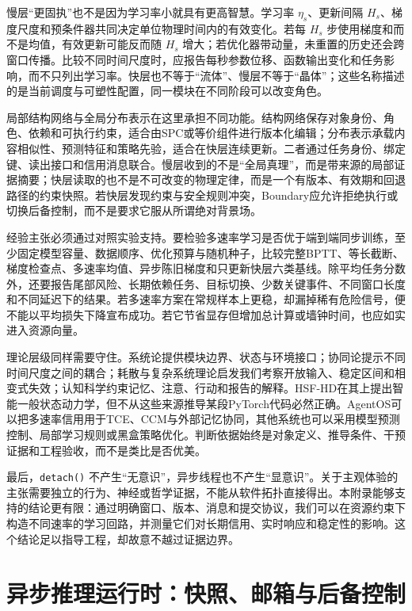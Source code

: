 慢层“更固执”也不是因为学习率小就具有更高智慧。学习率 $\eta_s$、更新间隔 $H_s$、梯度尺度和预条件器共同决定单位物理时间内的有效变化。若每 $H_s$ 步使用梯度和而不是均值，有效更新可能反而随 $H_s$ 增大；若优化器带动量，未重置的历史还会跨窗口传播。比较不同时间尺度时，应报告每秒参数位移、函数输出变化和任务影响，而不只列出学习率。快层也不等于“流体”、慢层不等于“晶体”；这些名称描述的是当前调度与可塑性配置，同一模块在不同阶段可以改变角色。

局部结构网络与全局分布表示在这里承担不同功能。结构网络保存对象身份、角色、依赖和可执行约束，适合由SPC或等价组件进行版本化编辑；分布表示承载内容相似性、预测特征和策略先验，适合在快层连续更新。二者通过任务身份、绑定键、读出接口和信用消息联合。慢层收到的不是“全局真理”，而是带来源的局部证据摘要；快层读取的也不是不可改变的物理定律，而是一个有版本、有效期和回退路径的约束快照。若快层发现约束与安全规则冲突，Boundary应允许拒绝执行或切换后备控制，而不是要求它服从所谓绝对背景场。

经验主张必须通过对照实验支持。要检验多速率学习是否优于端到端同步训练，至少固定模型容量、数据顺序、优化预算与随机种子，比较完整BPTT、等长截断、梯度检查点、多速率均值、异步陈旧梯度和只更新快层六类基线。除平均任务分数外，还要报告尾部风险、长期依赖任务、目标切换、少数关键事件、不同窗口长度和不同延迟下的结果。若多速率方案在常规样本上更稳，却漏掉稀有危险信号，便不能以平均损失下降宣布成功。若它节省显存但增加总计算或墙钟时间，也应如实进入资源向量。

理论层级同样需要守住。系统论提供模块边界、状态与环境接口；协同论提示不同时间尺度之间的耦合；耗散与复杂系统理论启发我们考察开放输入、稳定区间和相变式失效；认知科学约束记忆、注意、行动和报告的解释。HSF-HD在其上提出智能一般状态动力学，但不从这些来源推导某段PyTorch代码必然正确。AgentOS可以把多速率信用用于TCE、CCM与外部记忆协同，其他系统也可以采用模型预测控制、局部学习规则或黑盒策略优化。判断依据始终是对象定义、推导条件、干预证据和工程验收，而不是类比是否优美。

最后，\texttt{detach()} 不产生“无意识”，异步线程也不产生“显意识”。关于主观体验的主张需要独立的行为、神经或哲学证据，不能从软件拓扑直接得出。本附录能够支持的结论更有限：通过明确窗口、版本、消息和提交协议，我们可以在资源约束下构造不同速率的学习回路，并测量它们对长期信用、实时响应和稳定性的影响。这个结论足以指导工程，却故意不越过证据边界。

\section{异步推理运行时：快照、邮箱与后备控制}
\label{sec:app_asynchronous_inference}

